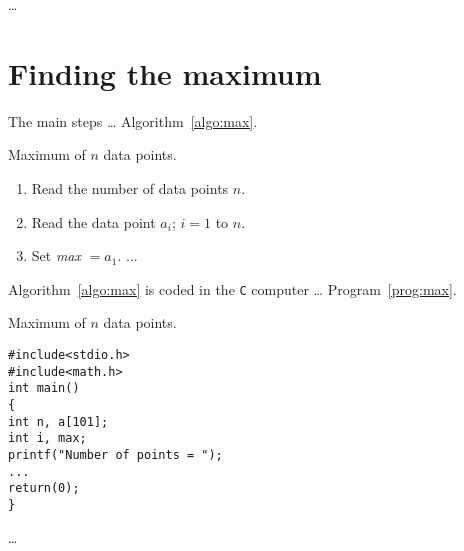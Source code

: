 \documentclass[a4paper]{article}
\begin{document}
…
\section{Finding the maximum}
The main steps … Algorithm~\ref{algo:max}.
\begin{algorithm}
\caption{Maximum of $n$ data points.}
\label{algo:max}
\begin{enumerate}
\item Read the number of data points $n$.
\item Read the data point $a_i$;
$i=1$ to $n$.
\item Set {\it max} $=a_1$.
...
\end{enumerate}
\end{algorithm}
%
Algorithm~\ref{algo:max} is coded in the
{\tt C} computer … Program~\ref{prog:max}.
\begin{program}
\caption{Maximum of $n$ data points.}
\label{prog:max}
\begin{verbatim}
#include<stdio.h>
#include<math.h>
int main()
{
int n, a[101];
int i, max;
printf("Number of points = ");
...
return(0);
}
\end{verbatim}
\end{program}
…
\end{document}
